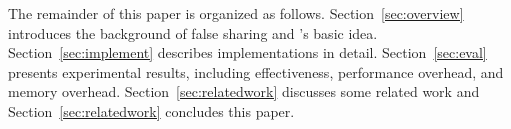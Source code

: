 The remainder of this paper is organized as follows. Section~\ref{sec:overview} introduces the background of false sharing and \cheetah{}'s basic idea. Section~\ref{sec:implement} describes implementations in detail. Section~\ref{sec:eval} presents experimental results, including effectiveness, performance overhead, and memory overhead. Section~\ref{sec:relatedwork} discusses some related work and Section~\ref{sec:relatedwork} concludes this paper. 




